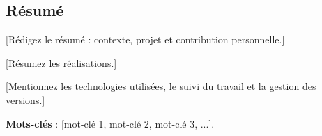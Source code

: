\documentclass[a4paper,12pt]{article}
\begin{document}
\begin{center}
    \begin{tcolorbox}[colback=white, colframe=black, width=\textwidth]
    \section*{Résumé}
    [Rédigez le résumé : contexte, projet et contribution personnelle.]

    [Résumez les réalisations.]

    [Mentionnez les technologies utilisées, le suivi du travail et la gestion des versions.]

    \textbf{Mots-clés} : [mot-clé 1, mot-clé 2, mot-clé 3, ...].
    \end{tcolorbox}
\end{center}
\end{document}
